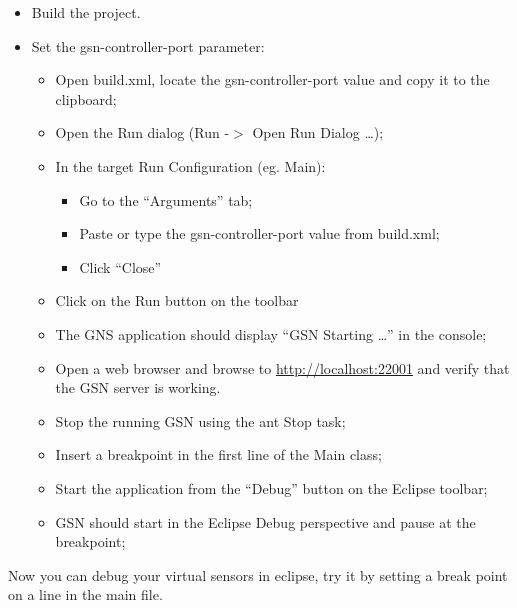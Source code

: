 \begin{itemize}
	\item Build the project.
	\item Set the gsn-controller-port parameter:
\begin{itemize}
	\item Open build.xml, locate the gsn-controller-port value and copy it to
the clipboard;
	\item Open the Run dialog (Run -\begin{math}>\end{math} Open Run Dialog
\ldots{});
	\item In the target Run Configuration (eg. Main):
\begin{itemize}
	\item Go to the \textquotedblleft{}Arguments\textquotedblright{} tab;
	\item Paste or type the gsn-controller-port value from build.xml;
	\item Click \textquotedblleft{}Close\textquotedblright{}
\end{itemize}

	\item Click on the Run button on the toolbar
	\item The GNS application should display \textquotedblleft{}GSN Starting
\ldots{}\textquotedblright{} in the console;
	\item Open a web browser and browse to \url{http://localhost:22001} and
verify that the GSN server is working.
	\item Stop the running GSN using the ant Stop task;
	\item Insert a breakpoint in the first line of the Main class;
	\item Start the application from the
\textquotedblleft{}Debug\textquotedblright{} button on the Eclipse
toolbar;
	\item GSN should start in the Eclipse Debug perspective and pause at the
breakpoint;
\end{itemize}

\end{itemize}

Now you can debug your virtual sensors in eclipse, try it by setting a
break point on a line in the main file.



